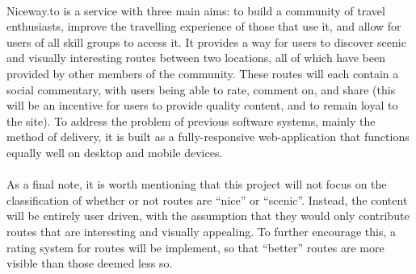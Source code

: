 \ \\
Niceway.to is a service with three main aims: to build a community of travel enthusiasts, improve the travelling experience of those that use it, and allow for users of all skill groups to access it. It provides a way for users to discover scenic and visually interesting routes between two locations, all of which have been provided by other members of the community. These routes will each contain a social commentary, with users being able to rate, comment on, and share (this will  be an incentive for users to provide quality content, and to remain loyal to the site). To address the problem of previous software systems, mainly the method of delivery, it is built as a fully-responsive web-application that functions equally well on desktop and mobile devices. \ \\
\ \\
As a final note, it is worth mentioning that this project will not focus on the classification of whether or not routes are ``nice'' or ``scenic''. Instead, the content will be entirely user driven, with the assumption that they would only contribute routes that are interesting and visually appealing. To further encourage this, a rating system for routes will be implement, so that ``better'' routes are more visible than those deemed less so.

